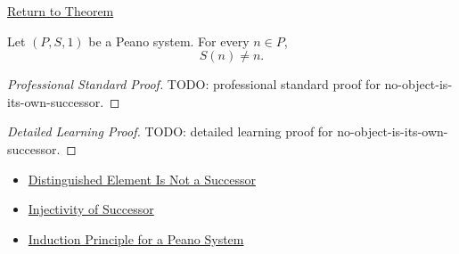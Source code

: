 \newpage
{}
\label{prf:no-object-is-its-own-successor}

\begin{remark*}[Return]
\hyperref[thm:no-object-is-its-own-successor]{Return to Theorem}
\end{remark*}

\begin{theorem*}
Let $(P,S,1)$ be a Peano system. For every $n \in P$,
\[
S(n) \neq n.
\]
\end{theorem*}

\begin{proof}[Professional Standard Proof]
\LRAProofBodyStart
TODO: professional standard proof for no-object-is-its-own-successor.
\end{proof}

\begin{proof}[Detailed Learning Proof]
\LRAProofBodyStart
TODO: detailed learning proof for no-object-is-its-own-successor.
\end{proof}

\begin{remark*}
\end{remark*}

\begin{dependencies}
\begin{itemize}
  \item \hyperref[ax:peano-base-not-successor]{Distinguished Element Is Not a Successor}
  \item \hyperref[ax:peano-successor-injective]{Injectivity of Successor}
  \item \hyperref[thm:induction-principle-for-peano-system]{Induction Principle for a Peano System}
\end{itemize}
\end{dependencies}


\clearpage
